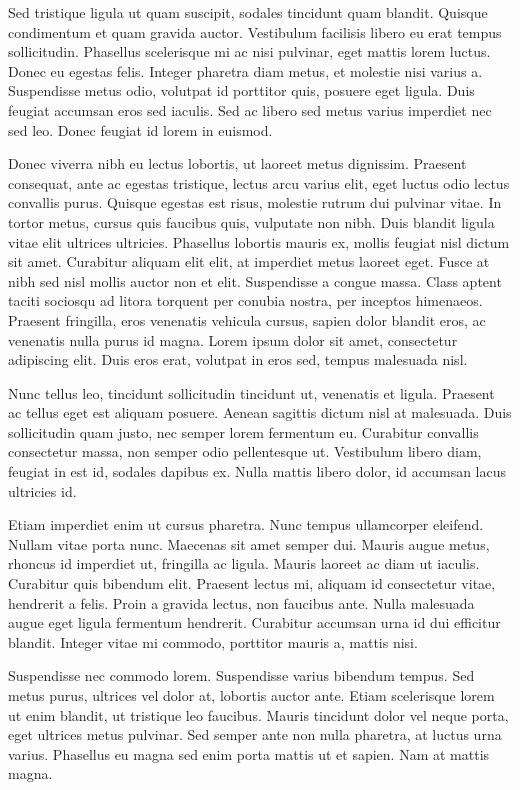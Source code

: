 {\par Sed tristique ligula ut quam suscipit, sodales tincidunt quam blandit. Quisque condimentum et quam gravida auctor. Vestibulum facilisis libero eu erat tempus sollicitudin. Phasellus scelerisque mi ac nisi pulvinar, eget mattis lorem luctus. Donec eu egestas felis. Integer pharetra diam metus, et molestie nisi varius a. Suspendisse metus odio, volutpat id porttitor quis, posuere eget ligula. Duis feugiat accumsan eros sed iaculis. Sed ac libero sed metus varius imperdiet nec sed leo. Donec feugiat id lorem in euismod.
\par Donec viverra nibh eu lectus lobortis, ut laoreet metus dignissim. Praesent consequat, ante ac egestas tristique, lectus arcu varius elit, eget luctus odio lectus convallis purus. Quisque egestas est risus, molestie rutrum dui pulvinar vitae. In tortor metus, cursus quis faucibus quis, vulputate non nibh. Duis blandit ligula vitae elit ultrices ultricies. Phasellus lobortis mauris ex, mollis feugiat nisl dictum sit amet. Curabitur aliquam elit elit, at imperdiet metus laoreet eget. Fusce at nibh sed nisl mollis auctor non et elit. Suspendisse a congue massa. Class aptent taciti sociosqu ad litora torquent per conubia nostra, per inceptos himenaeos. Praesent fringilla, eros venenatis vehicula cursus, sapien dolor blandit eros, ac venenatis nulla purus id magna. Lorem ipsum dolor sit amet, consectetur adipiscing elit. Duis eros erat, volutpat in eros sed, tempus malesuada nisl.
\par Nunc tellus leo, tincidunt sollicitudin tincidunt ut, venenatis et ligula. Praesent ac tellus eget est aliquam posuere. Aenean sagittis dictum nisl at malesuada. Duis sollicitudin quam justo, nec semper lorem fermentum eu. Curabitur convallis consectetur massa, non semper odio pellentesque ut. Vestibulum libero diam, feugiat in est id, sodales dapibus ex. Nulla mattis libero dolor, id accumsan lacus ultricies id.
\par Etiam imperdiet enim ut cursus pharetra. Nunc tempus ullamcorper eleifend. Nullam vitae porta nunc. Maecenas sit amet semper dui. Mauris augue metus, rhoncus id imperdiet ut, fringilla ac ligula. Mauris laoreet ac diam ut iaculis. Curabitur quis bibendum elit. Praesent lectus mi, aliquam id consectetur vitae, hendrerit a felis. Proin a gravida lectus, non faucibus ante. Nulla malesuada augue eget ligula fermentum hendrerit. Curabitur accumsan urna id dui efficitur blandit. Integer vitae mi commodo, porttitor mauris a, mattis nisi.
\par Suspendisse nec commodo lorem. Suspendisse varius bibendum tempus. Sed metus purus, ultrices vel dolor at, lobortis auctor ante. Etiam scelerisque lorem ut enim blandit, ut tristique leo faucibus. Mauris tincidunt dolor vel neque porta, eget ultrices metus pulvinar. Sed semper ante non nulla pharetra, at luctus urna varius. Phasellus eu magna sed enim porta mattis ut et sapien. Nam at mattis magna.}

